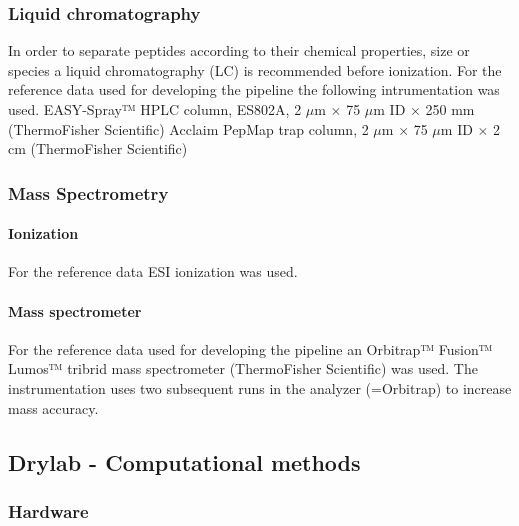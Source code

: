 \documentclass[
  11pt,
]{article}
\begin{document}
\hypertarget{liquid-chromatography}{%
\subsubsection{Liquid chromatography}\label{liquid-chromatography}}

In order to separate peptides according to their chemical properties, size or species a liquid chromatography (LC) is recommended before ionization. For the reference data used for developing the pipeline the following intrumentation was used.
EASY-Spray™ HPLC column, ES802A, 2 \(\mu\)m × 75 \(\mu\)m ID × 250 mm (ThermoFisher Scientific)
Acclaim PepMap trap column, 2 \(\mu\)m × 75 \(\mu\)m ID × 2 cm (ThermoFisher Scientific)

\hypertarget{mass-spectrometry-1}{%
\subsubsection{Mass Spectrometry}\label{mass-spectrometry-1}}

\hypertarget{ionization}{%
\paragraph{Ionization}\label{ionization}}

For the reference data ESI ionization was used.

\hypertarget{mass-spectrometer}{%
\paragraph{Mass spectrometer}\label{mass-spectrometer}}

For the reference data used for developing the pipeline an Orbitrap™ Fusion™ Lumos™ tribrid mass spectrometer (ThermoFisher Scientific) was used. The instrumentation uses two subsequent runs in the analyzer (=Orbitrap) to increase mass accuracy.

\hypertarget{drylab---computational-methods}{%
\subsection{Drylab - Computational methods}\label{drylab---computational-methods}}

\hypertarget{hardware}{%
\subsubsection{Hardware}\label{hardware}}
\end{document}
